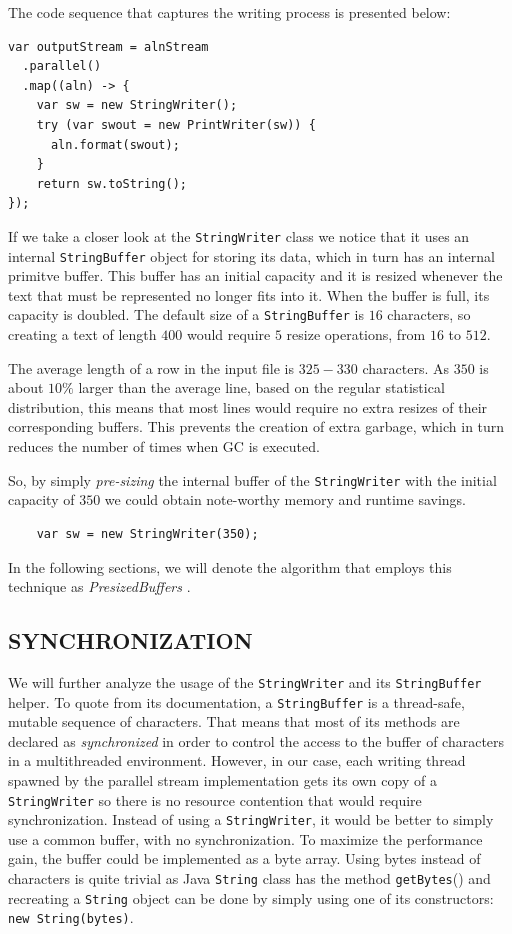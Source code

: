 \documentclass[a4paper,twoside]{article}
\begin{document}
{The code sequence that captures the writing process is presented below:
\begin{verbatim}
var outputStream = alnStream
  .parallel()
  .map((aln) -> {
    var sw = new StringWriter();
    try (var swout = new PrintWriter(sw)) {
      aln.format(swout);
    }
    return sw.toString();
});
\end{verbatim}

If we take a closer look at the {\texttt{StringWriter}} class we notice that it uses an internal {\texttt{StringBuffer}} object for storing its data, which in turn has an internal primitve buffer.
This buffer has an initial capacity and it is resized whenever the text that must be represented no longer fits into it. When the buffer is full, its capacity is doubled. 
The default size of a \texttt{StringBuffer} is $16$ characters, so creating a text of length $400$ would require $5$ resize operations, from $16$ to $512$. 

The average length of a row in the input file is $325 - 330$ characters.
As $350$ is about $10\%$ larger than the average line, based on the regular statistical distribution, this means that most lines would require no extra resizes of their corresponding buffers. This prevents the creation of extra garbage, which in turn reduces the number of times when GC is executed.

So, by simply {\textit{pre-sizing} } the internal buffer of the \texttt{StringWriter} with the initial capacity of $350$ we could obtain note-worthy memory and runtime savings.
\begin{verbatim}
    var sw = new StringWriter(350);
\end{verbatim}
In the following sections, we will denote the algorithm that employs this technique as {\textit{PresizedBuffers} }.


\subsection{\uppercase{Synchronization}}
\label{subsec:sync}

We will further analyze the usage of the \texttt{StringWriter} and its \texttt{StringBuffer} helper.
To quote from its documentation, a {\texttt{StringBuffer}} is  a thread-safe, mutable sequence of characters.
That means that most of its methods are declared as {\textit{synchronized}} in order to control the access to the buffer of characters in a multithreaded environment.
However, in our case, each writing thread spawned by the parallel stream implementation gets its own copy of a {\texttt{StringWriter}} so there is no resource contention that would require synchronization.
Instead of using a {\texttt{StringWriter}}, it would be better to simply use a common buffer, with no synchronization.
To maximize the performance gain, the buffer could be implemented as a byte array.
Using bytes instead of characters is quite trivial as Java {\texttt{String}} class has the method {\texttt{getBytes}()} and recreating a {\texttt{String}} object can be done by simply using one of its constructors: {\texttt{new String(bytes)}}.

}
\end{document}
